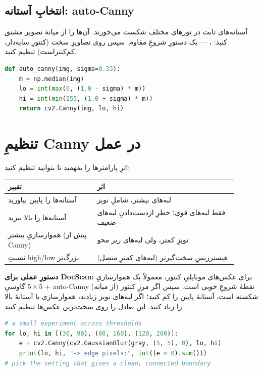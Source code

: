 \documentclass[12pt,a4paper]{article}
\begin{document}
\subsection{انتخابِ آستانه: auto-Canny}

آستانه‌های ثابت در نورهای مختلف شکست می‌خورند. آن‌ها را از میانهٔ تصویر مشتق کنید:
،  — یک دستورِ شروعِ مقاوم. سپس روی تصاویرِ سخت
(کنتورِ سایه‌دار، کم‌کنتراست) تنظیم کنید.

\begin{ltrcode}
\begin{lstlisting}[language=Python]
def auto_canny(img, sigma=0.33):
    m = np.median(img)
    lo = int(max(0, (1.0 - sigma) * m))
    hi = int(min(255, (1.0 + sigma) * m))
    return cv2.Canny(img, lo, hi)
\end{lstlisting}
\end{ltrcode}

\section{تنظیمِ Canny در عمل}

اثرِ پارامترها را بفهمید تا بتوانید تنظیم کنید:

\begin{center}
\begin{tabular}{>{\raggedright\arraybackslash}p{0.35\linewidth} >{\raggedright\arraybackslash}p{0.55\linewidth}}
\toprule
\textbf{تغییر} & \textbf{اثر} \\
\midrule
آستانه‌ها را پایین بیاورید & لبه‌های بیشتر، شاملِ نویز \\
آستانه‌ها را بالا ببرید & فقط لبه‌های قوی؛ خطرِ از‌دست‌دادنِ لبه‌های ضعیف \\
هموارسازیِ بیشتر (پیش از Canny) & نویزِ کمتر، ولی لبه‌های ریز محو \\
نسبتِ high/low بزرگ‌تر & هیسترزیسِ سخت‌گیرتر (لبه‌های کمترِ متصل) \\
\bottomrule
\end{tabular}
\end{center}

\textbf{دستورِ عملی برای DocScan:} برای عکس‌های موبایلیِ کنتور، معمولاً یک هموارسازیِ گاوسیِ
$5\times5$ + auto-Canny (از میانه) نقطهٔ شروعِ خوبی است. سپس اگر مرزِ کنتور شکسته است، آستانهٔ
پایین را کم کنید؛ اگر لبه‌های نویز زیادند، هموارسازی یا آستانهٔ بالا را زیاد کنید. این تعادل را روی
سخت‌ترین عکس‌ها تنظیم کنید.

\begin{ltrcode}
\begin{lstlisting}[language=Python]
# a small experiment across thresholds
for lo, hi in [(30, 90), (80, 160), (120, 200)]:
    e = cv2.Canny(cv2.GaussianBlur(gray, (5, 5), 0), lo, hi)
    print(lo, hi, "-> edge pixels:", int((e > 0).sum()))
# pick the setting that gives a clean, connected boundary
\end{lstlisting}
\end{ltrcode}
\end{document}
